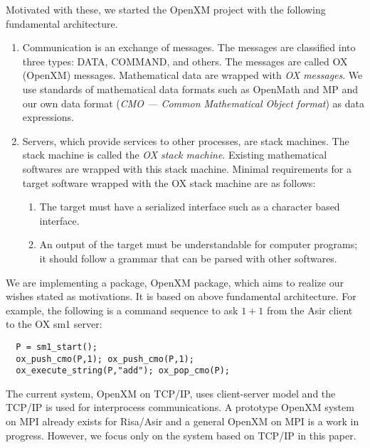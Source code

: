 Motivated with these, we started the OpenXM project with the following
fundamental architecture.
\begin{enumerate}
\item Communication is an exchange of messages. The messages are classified into
three types:
DATA, COMMAND, and others.
The messages are called OX (OpenXM) messages.
Mathematical data are wrapped with {\it OX messages}.
We use standards of mathematical data formats such as OpenMath and MP
and our own data format ({\it CMO --- Common Mathematical Object format})
as data expressions.
\item Servers, which provide services to other processes, are stack machines.
The stack machine is called the
{\it OX stack machine}.
Existing mathematical softwares are wrapped with this stack machine.
Minimal requirements for a target software wrapped with the OX stack machine
are as follows:
\begin{enumerate}
\item The target must have a serialized interface such as a character based
interface.
\item An output of the target must be understandable for computer programs;
it should follow a grammar that can be parsed with other softwares.
\end{enumerate}
\end{enumerate}
We are implementing a package, OpenXM package,  
which aims to realize our wishes stated as motivations.
It is based on above fundamental architecture.
For example, the following is a command sequence to ask $1+1$ from
the Asir client to the OX sm1 server:
\begin{verbatim}
  P = sm1_start();
  ox_push_cmo(P,1); ox_push_cmo(P,1);
  ox_execute_string(P,"add"); ox_pop_cmo(P);
\end{verbatim}
The current system, OpenXM on TCP/IP, 
uses client-server model and the TCP/IP is used for interprocess
communications.
A prototype OpenXM system on MPI \cite{MPI} already exists for Risa/Asir and
a general OpenXM on MPI is a work in progress.
However, we focus only on the system based on TCP/IP in this paper.



